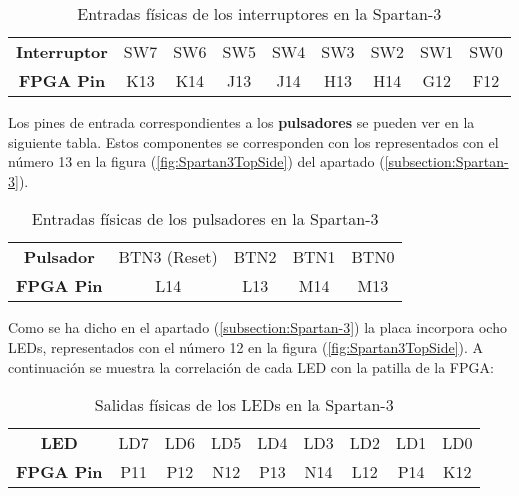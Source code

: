 \begin{table}[H]
        \centering
		\begin{tabular}{|c|c|c|c|c|c|c|c|c|}
			\hline
			\rowcolor[rgb]{0.21,0.69,0.87}\multicolumn{9}{|c|}{  \textbf{ {Entradas Interruptores}}} \\
			\hline \hline
			\textbf{  Interruptor  } & SW7 & SW6 & SW5 & SW4 & SW3 & SW2 & SW1 & SW0 \\
			\hline
			\textbf{  FPGA Pin  } & K13 & K14 & J13 & J14 & H13 & H14 & G12 & F12 \\
			\hline
			 
		\end{tabular}
	\caption{ Entradas físicas de los interruptores en la Spartan-3 }
	\label{tab:tablaEntradasInterruptores}
\end{table}

Los pines de entrada correspondientes a los \textbf{pulsadores} se pueden ver en la siguiente tabla. Estos componentes se corresponden con los representados con el número 13 en la figura (\ref{fig:Spartan3TopSide}) del apartado (\ref{subsection:Spartan-3}).

\begin{table}[H]
        \centering
		\begin{tabular}{|c|c|c|c|c|}
			\hline
			\rowcolor[rgb]{0.21,0.69,0.87}\multicolumn{5}{|c|}{  \textbf{ {Entradas Pulsadores}}} \\
			\hline \hline
			\textbf{  Pulsador  } & BTN3 (Reset) & BTN2 & BTN1 & BTN0  \\
			\hline
			\textbf{  FPGA Pin  } & L14 & L13 & M14 & M13  \\
			\hline
			 
		\end{tabular}
	\caption{ Entradas físicas de los pulsadores en la Spartan-3 }
	\label{tab:tablaEntradasPulsadores}
\end{table}

Como se ha dicho en el apartado (\ref{subsection:Spartan-3}) la placa incorpora ocho LEDs, representados con el número 12 en la figura (\ref{fig:Spartan3TopSide}). A continuación se muestra la correlación de cada LED con la patilla de la FPGA:

\begin{table}[H]
        \centering
		\begin{tabular}{|c|c|c|c|c|c|c|c|c|}
			\hline
			\rowcolor[rgb]{0.21,0.69,0.87}\multicolumn{9}{|c|}{  \textbf{ {Salidas LED}}} \\
			\hline \hline
			\textbf{  LED  } & LD7 & LD6 & LD5 & LD4 & LD3 & LD2 & LD1 & LD0 \\
			\hline
			\textbf{  FPGA Pin  } & P11 & P12 & N12 & P13 & N14 & L12 & P14 & K12  \\
			\hline
			 
		\end{tabular}
	\caption{ Salidas físicas de los LEDs en la Spartan-3 }
	\label{tab:tablaSalidasLED}
\end{table}